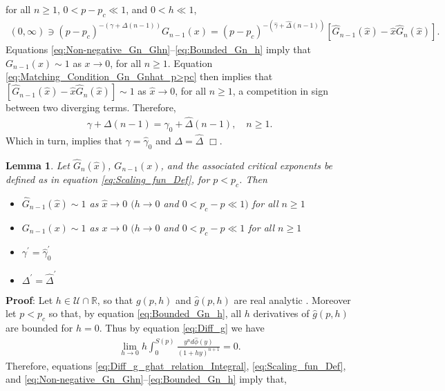 \documentclass[english,12pt]{ttuthes}
\newtheorem{lemma}{Lemma}[chapter]
\newcommand{\ph}{\hat{\phi}}
\newcommand{\gh}{\hat{\gamma}}
\newcommand{\Dh}{\hat{\Delta}}
\newcommand{\xh}{\hat{x}}
\begin{document}
for all $n\geq1$, $0<p-p_c\ll1$, and $0<h\ll1$,   
%
\begin{align}\label{eq:Matching_Condition_Gn_Gnhat_p>pc}
  (0,\infty)\ni(p-p_c)^{-(\gamma+\Delta(n-1))}G_{n-1}(x)
       =(p-p_c)^{-(\gh+\Dh(n-1))}[\hat{G}_{n-1}(\xh)-\xh\hat{G}_n(\xh)].
\end{align}
%
Equations \eqref{eq:Non-negative_Gn_Ghn}--\eqref{eq:Bounded_Gn_h}
imply that $G_{n-1}(x)\sim1$ as $x\to0$, for all $n\geq1$. Equation
\eqref{eq:Matching_Condition_Gn_Gnhat_p>pc} then implies that 
$[\hat{G}_{n-1}(\xh)-\xh\hat{G}_n(\xh)]\sim1$ as $\xh\to0$,
for all $n\geq1$, a competition in sign between two diverging
terms. %
Therefore, 
%
\begin{align}
  \gamma+\Delta(n-1)=\gh_0+\Dh(n-1), \quad n\geq1.
\end{align}
%
Which in turn, implies that $\gamma=\gh_0$ and $\Delta=\Dh$ $\Box$.
%
%
 \begin{lemma}\label{lem:asymp_Scaling_funs_x_to_0_p<pc}
   Let $\hat{G}_n(\xh)$, $G_{n-1}(x)$, and the associated critical
   exponents be defined as in equation \eqref{eq:Scaling_fun_Def}, for
   $p<p_c$. Then
     \begin{itemize}
    \item[1)] $\hat{G}_{n-1}(\xh)\sim1$ as $\xh\to0$ $(h\to0$ and $0<p_c-p\ll1)$
      for all $n\geq1$ 
    \item[2)] $G_{n-1}(x)\sim1$ as $x\to0$ $(h\to0$ and $0<p_c-p\ll1$ for all $n\geq1$
    \item[3)] $\gamma^\prime=\gh_0^\prime$  
    \item[4)] $\Delta^\prime=\Dh^\prime$    
     \end{itemize}
 \end{lemma}
%
\noindent \textbf{Proof}:
%
Let $h\in\mathcal{U}\cap\mathbb{R}$, so that $g(p,h)$ and $\hat{g}(p,h)$ are
real analytic \cite{Golden:CMP-473}. Moreover let $p<p_c$ so that, by
equation \eqref{eq:Bounded_Gn_h}, all $h$ derivatives of
$\hat{g}(p,h)$ are bounded for $h=0$. Thus by equation
\eqref{eq:Diff_g} we have   
%
\begin{align*}
  \lim_{h\to0}h \int_0^{S(p)}\frac{y^nd\ph(y)}{(1+hy)^{n+1}}=0.
\end{align*}
%
Therefore, equations \eqref{eq:Diff_g_ghat_relation_Integral}, 
\eqref{eq:Scaling_fun_Def}, and
\eqref{eq:Non-negative_Gn_Ghn}--\eqref{eq:Bounded_Gn_h} imply that,
\end{document}
